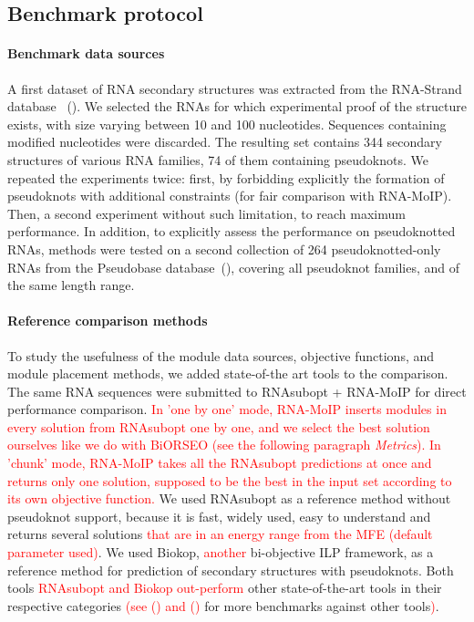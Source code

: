 \documentclass{bioinfo}
\begin{document}
\subsection{Benchmark protocol} \label{sec:bench}

\paragraph{Benchmark data sources} \label{sec:data}
A first dataset of RNA secondary structures was extracted from the RNA-Strand database ~(\citealp{andronescu2008rna}). We selected the RNAs for which experimental proof of the structure exists, with size varying between 10 and 100 nucleotides. Sequences containing modified nucleotides were discarded. The resulting set contains 344 secondary structures of various RNA families, 74 of them containing pseudoknots. We repeated the experiments twice: first, by forbidding explicitly the formation of pseudoknots with additional constraints (for fair comparison with RNA-MoIP). 
Then, a second experiment without such limitation, to reach maximum performance. In addition, to explicitly assess the performance on pseudoknotted RNAs, methods were tested on a second collection of 264 pseudoknotted-only RNAs from the Pseudobase database~(\citealp{van2000pseudobase}), covering all pseudoknot families, and of the same length range.

\paragraph{Reference comparison methods}
To study the usefulness of the module data sources, objective functions, and module placement methods, we added state-of-the art tools to the comparison. 
The same RNA sequences were submitted to RNAsubopt + RNA-MoIP for direct performance comparison. 
\textcolor{red}{In 'one by one' mode, RNA-MoIP inserts modules in every solution from RNAsubopt one by one, and we select the best solution ourselves like we do with BiORSEO (see the following paragraph \textit{Metrics}). In 'chunk' mode, RNA-MoIP takes all the RNAsubopt predictions at once and returns only one solution, supposed to be the best in the input set according to its own objective function.} 
We used RNAsubopt as a reference method without pseudoknot support, because it is fast, widely used, easy to understand and returns several solutions \textcolor{red}{that are in an energy range from the MFE (default parameter used)}. 
We used Biokop, \textcolor{red}{another} bi-objective ILP framework, as a reference method for prediction of secondary structures with pseudoknots. 
Both tools \textcolor{red}{RNAsubopt and Biokop out-perform} other state-of-the-art tools in their respective categories \textcolor{red}{(see  (\citealp{lorenz2011viennarna}) and  (\citealp{legendre_bi-objective_2018})} for more benchmarks against other tools\textcolor{red}{)}.
\end{document}
